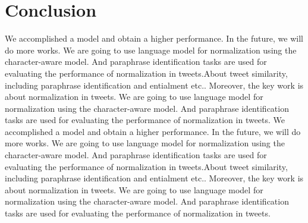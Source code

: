 \documentclass[letterpaper]{article}
\begin{document}
\section{Conclusion}
We accomplished a model and obtain a higher performance. In the future, we will do more works. We are going to use language model for normalization using the character-aware model. And paraphrase identification tasks are used for evaluating the performance of normalization in tweets.About tweet similarity, including paraphrase identification and entialment etc.. Moreover, the key work is about normalization in tweets. We are going to use language model for normalization using the character-aware model. And paraphrase identification tasks are used for evaluating the performance of normalization in tweets. We accomplished a model and obtain a higher performance. In the future, we will do more works. We are going to use language model for normalization using the character-aware model. And paraphrase identification tasks are used for evaluating the performance of normalization in tweets.About tweet similarity, including paraphrase identification and entialment etc.. Moreover, the key work is about normalization in tweets. We are going to use language model for normalization using the character-aware model. And paraphrase identification tasks are used for evaluating the performance of normalization in tweets.



\end{document}
